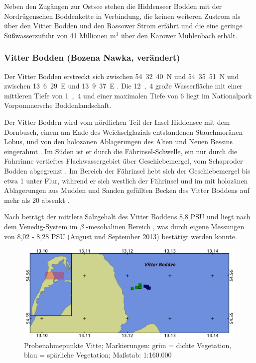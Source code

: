 Neben den Zugängen zur Ostsee stehen die Hiddenseer Bodden mit der Nordrügenschen Boddenkette in Verbindung, die keinen weiteren Zustrom als über den Vitter Bodden und den Rassower Strom erfährt und die eine geringe Süßwasserzufuhr von 41 Millionen m$^3$ über den Karower Mühlenbach erhält.



\subsubsection{Vitter Bodden (Bozena Nawka, verändert)}


Der Vitter Bodden erstreckt sich zwischen 54\textdegree\ 32\textquotesingle\ 40\dq\ N und 54\textdegree\ 35\textquotesingle\ 51\dq\ N und zwischen 13\textdegree\ 6\textquotesingle\ 29\dq\ E und 13\textdegree\ 9\textquotesingle\ 37\dq\ E \citep{nathansen_2014}. Die \unit{12,4}{\kilo\metre\squared} große Wasserfläche mit einer mittleren Tiefe von \unit{1,4}{\metre} \citep{correns_1976} und einer maximalen Tiefe von \unit{6}{\metre} \citep{biele_1997} liegt im Nationalpark Vorpommersche Boddenlandschaft.

Der Vitter Bodden wird vom nördlichen Teil der Insel Hiddensee mit dem Dornbusch, einem am Ende des Weichselglazials entstandenen Stauchmoränen-Lobus, und von den holozänen Ablagerungen des Alten und Neuen Bessins eingerahmt \citep{katzung_2004}.
Im Süden ist er durch die Fährinsel-Schwelle, ein nur durch die Fahrrinne vertieftes Flachwassergebiet über Geschiebemergel, vom Schaproder Bodden abgegrenzt \citep{mobus_2001}. Im Bereich der Fährinsel hebt sich der Geschiebemergel bis etwa \unit{1}{\metre} unter Flur, während er sich westlich der Fährinsel und im mit holozänen Ablagerungen aus Mudden und Sanden gefüllten Becken des Vitter Boddens auf mehr als \unit{20}{\metre} absenkt \citep{mobus_2001}.

Nach \cite{bachor_2005} beträgt der mittlere Salzgehalt des Vitter Boddens 8,8 PSU und liegt nach dem Venedig-System im $\beta$ -mesohalinen Bereich \citep{gosselck_2011}, was durch eigene Messungen von 8,02 - 8,28 PSU (August und September 2013) bestätigt werden konnte. 

\begin{figure}[htb]
\centering
\includegraphics[width=1\textwidth]{images/Vitte.png}
\caption[Probenahmepunkte Vitte]{Probenahmepunkte Vitte; Markierungen: grün = dichte Vegetation, blau = spärliche Vegetation; Maßstab: 1:160.000}
\label{Vitte}
\end{figure}


